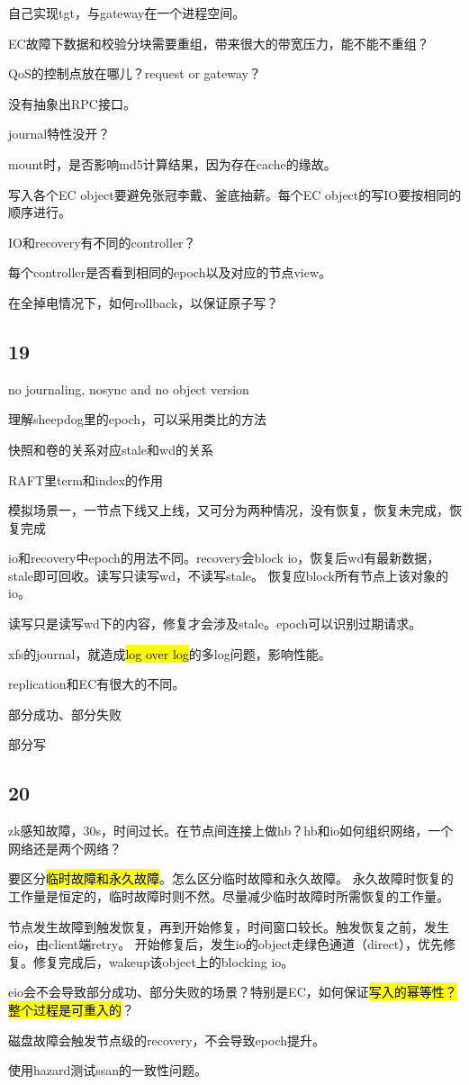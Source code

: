 自己实现tgt，与gateway在一个进程空间。

EC故障下数据和校验分块需要重组，带来很大的带宽压力，能不能不重组？

QoS的控制点放在哪儿？request or gateway？

没有抽象出RPC接口。

journal特性没开？

mount时，是否影响md5计算结果，因为存在cache的缘故。

写入各个EC object要避免张冠李戴、釜底抽薪。每个EC object的写IO要按相同的顺序进行。

IO和recovery有不同的controller？

每个controller是否看到相同的epoch以及对应的节点view。

在全掉电情况下，如何rollback，以保证原子写？

\subsection{19}

no journaling, nosync and no object version

理解sheepdog里的epoch，可以采用类比的方法
\begin{enumbox}
\item 快照和卷的关系对应stale和wd的关系
\item RAFT里term和index的作用
\end{enumbox}

模拟场景一，一节点下线又上线，又可分为两种情况，没有恢复，恢复未完成，恢复完成

io和recovery中epoch的用法不同。recovery会block io，恢复后wd有最新数据，stale即可回收。读写只读写wd，不读写stale。
恢复应block所有节点上该对象的io。

读写只是读写wd下的内容，修复才会涉及stale。epoch可以识别过期请求。

xfs的journal，就造成\hl{log over log}的多log问题，影响性能。

replication和EC有很大的不同。

部分成功、部分失败

部分写

\subsection{20}

zk感知故障，30s，时间过长。在节点间连接上做hb？hb和io如何组织网络，一个网络还是两个网络？

要区分\hl{临时故障和永久故障}。怎么区分临时故障和永久故障。
永久故障时恢复的工作量是恒定的，临时故障时则不然。尽量减少临时故障时所需恢复的工作量。

节点发生故障到触发恢复，再到开始修复，时间窗口较长。触发恢复之前，发生eio，由client端retry。
开始修复后，发生io的object走绿色通道（direct），优先修复。修复完成后，wakeup该object上的blocking io。

eio会不会导致部分成功、部分失败的场景？特别是EC，如何保证\hl{写入的幂等性？整个过程是可重入的}？

磁盘故障会触发节点级的recovery，不会导致epoch提升。

使用hazard测试ssan的一致性问题。
